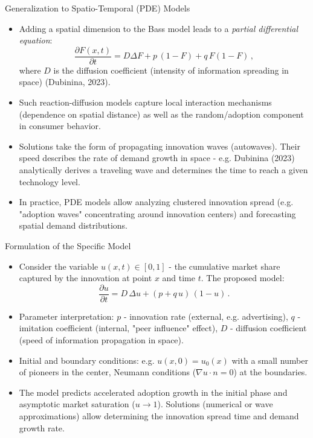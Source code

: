 \documentclass[9pt]{beamer}
\begin{document}
\begin{frame}{Generalization to Spatio-Temporal (PDE) Models}
\begin{itemize}
  \item Adding a spatial dimension to the Bass model leads to a \emph{partial differential equation}:
  $$\frac{\partial F(x,t)}{\partial t} = D \Delta F + p\,(1-F) + q\,F(1-F)\,,
  $$
  where $D$ is the diffusion coefficient (intensity of information spreading in space) (Dubinina, 2023).
  \item Such reaction-diffusion models capture local interaction mechanisms (dependence on spatial distance) as well as the random/adoption component in consumer behavior.
  \item Solutions take the form of propagating innovation waves (autowaves). Their speed describes the rate of demand growth in space - e.g. Dubinina (2023) analytically derives a traveling wave and determines the time to reach a given technology level.
  \item In practice, PDE models allow analyzing clustered innovation spread (e.g. "adoption waves" concentrating around innovation centers) and forecasting spatial demand distributions.
\end{itemize}
\end{frame}

\begin{frame}{Formulation of the Specific Model}
\begin{itemize}
  \item Consider the variable $u(x,t)\in[0,1]$ - the cumulative market share captured by the innovation at point $x$ and time $t$. The proposed model:
  $$\frac{\partial u}{\partial t} = D\,\Delta u + (p + q\,u)\,(1-u)\,. $$
  \item Parameter interpretation: $p$ - innovation rate (external, e.g. advertising), $q$ - imitation coefficient (internal, "peer influence" effect), $D$ - diffusion coefficient (speed of information propagation in space).
  \item Initial and boundary conditions: e.g. $u(x,0)=u_0(x)$ with a small number of pioneers in the center, \; Neumann conditions ($\nabla u\cdot n=0$) at the boundaries.
  \item The model predicts accelerated adoption growth in the initial phase and asymptotic market saturation ($u\to1$). Solutions (numerical or wave approximations) allow determining the innovation spread time and demand growth rate.
\end{itemize}
\end{frame}
\end{document}
